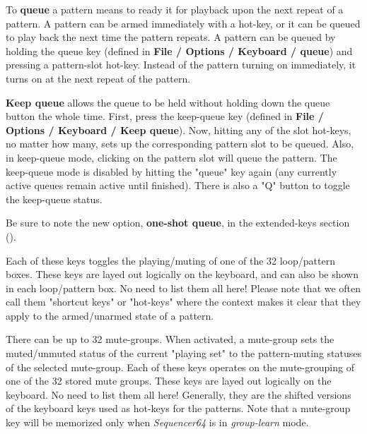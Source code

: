 %
%
%


   To \textbf{queue}
   a pattern means to ready it for playback upon the next repeat
   of a pattern.  A pattern can be armed immediately with a hot-key,
   or it can be queued to play back the next time the pattern repeats.
   A pattern can be queued by holding the queue key (defined in
   \textbf{File / Options / Keyboard / queue}) and pressing a pattern-slot
   hot-key.  Instead of the pattern turning on
   immediately, it turns on at the next repeat of the pattern.

   \textbf{Keep queue}
   allows the queue to be held without holding
   down the queue button the whole time.  First, press the keep-queue key
   (defined in \textbf{File / Options / Keyboard / Keep queue}).  Now, hitting
   any of the slot hot-keys, no matter how many, sets up the corresponding
   pattern slot to be queued.  Also, in keep-queue mode, clicking on the
   pattern slot will queue the pattern.  The keep-queue mode is disabled by
   hitting the "queue" key again (any currently active queues remain active
   until finished).  There is also a "Q" button to toggle the keep-queue
   status.

   Be sure to note the new option, \textbf{one-shot queue}, in the
   extended-keys section ().

   Each of these keys toggles the playing/muting of one of the 32
   loop/pattern boxes.  These keys are layed out logically on the keyboard,
   and can also be shown in each loop/pattern box.  No need to list them all
   here!  Please note that we often call them "shortcut keys" or
   "hot-keys" where the context
   makes it clear that they apply to the armed/unarmed state of a pattern.

   There can be up to 32 mute-groups.
   When activated, a mute-group
   sets the muted/unmuted status of the current "playing set"
   to the pattern-muting statuses of the selected mute-group.
   Each of these keys operates on the mute-grouping of one of the 32
   stored mute groups.
   These keys are layed out logically on the keyboard.
   No need to list them all here!
   Generally, they are the shifted versions of the
   keyboard keys used as hot-keys for the patterns.
   Note that a mute-group key will be memorized only when
   \textsl{Sequencer64} is in
    \textsl{group-learn} mode.

